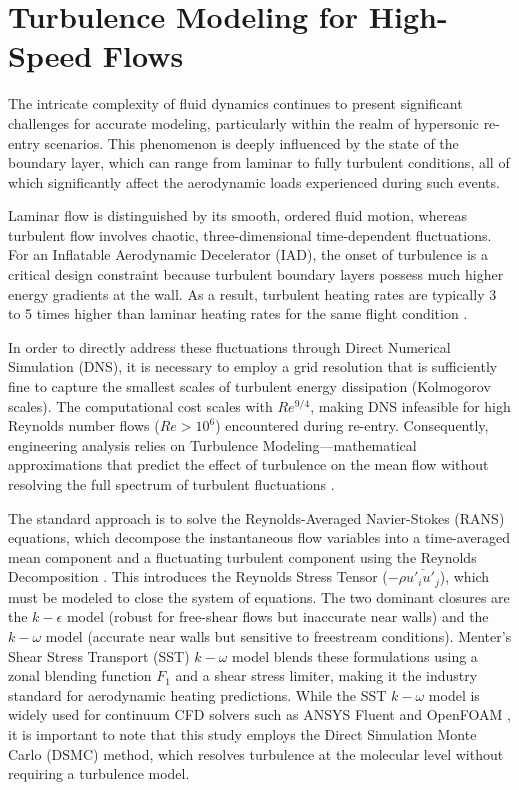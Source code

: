 \section{Turbulence Modeling for High-Speed Flows}
The intricate complexity of fluid dynamics continues to present significant challenges for accurate modeling, particularly within the realm of hypersonic re-entry scenarios. This phenomenon is deeply influenced by the state of the boundary layer, which can range from laminar to fully turbulent conditions, all of which significantly affect the aerodynamic loads experienced during such events.
\par
Laminar flow is distinguished by its smooth, ordered fluid motion, whereas turbulent flow involves chaotic, three-dimensional time-dependent fluctuations. For an Inflatable Aerodynamic Decelerator (IAD), the onset of turbulence is a critical design constraint because turbulent boundary layers possess much higher energy gradients at the wall. As a result, turbulent heating rates are typically 3 to 5 times higher than laminar heating rates for the same flight condition \cite{AndersonHypersonic}.
\par
In order to directly address these fluctuations through Direct Numerical Simulation (DNS), it is necessary to employ a grid resolution that is sufficiently fine to capture the smallest scales of turbulent energy dissipation (Kolmogorov scales). The computational cost scales with $Re^{9/4}$, making DNS infeasible for high Reynolds number flows ($Re > 10^6$) encountered during re-entry. Consequently, engineering analysis relies on Turbulence Modeling—mathematical approximations that predict the effect of turbulence on the mean flow without resolving the full spectrum of turbulent fluctuations \cite{versteeg2007cfd}.
\par
The standard approach is to solve the Reynolds-Averaged Navier-Stokes (RANS) equations, which decompose the instantaneous flow variables into a time-averaged mean component and a fluctuating turbulent component using the Reynolds Decomposition \cite{versteeg2007cfd}. This introduces the Reynolds Stress Tensor ($-\rho \overline{u'_i u'_j}$), which must be modeled to close the system of equations. The two dominant closures are the $k-\epsilon$ model (robust for free-shear flows but inaccurate near walls) and the $k-\omega$ model (accurate near walls but sensitive to freestream conditions). Menter's Shear Stress Transport (SST) $k-\omega$ model \cite{menter1994SST} blends these formulations using a zonal blending function $F_1$ and a shear stress limiter, making it the industry standard for aerodynamic heating predictions. While the SST $k-\omega$ model is widely used for continuum CFD solvers such as ANSYS Fluent and OpenFOAM \cite{versteeg2007cfd}, it is important to note that this study employs the Direct Simulation Monte Carlo (DSMC) method, which resolves turbulence at the molecular level without requiring a turbulence model.

